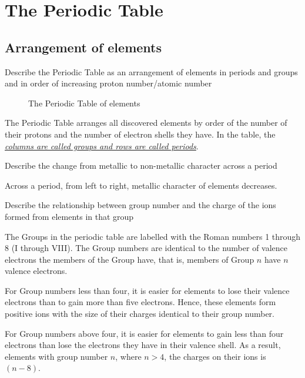 \section{The Periodic Table}
\subsection{Arrangement of elements}

\begin{point}
Describe the Periodic Table as an arrangement of elements in periods and groups and in order of increasing 
proton number/atomic number
\end{point}

\begin{figure}
	\caption{The Periodic Table of elements}
\end{figure}

The Periodic Table arranges all discovered elements by order of the number of their protons and
the number of electron shells they have. In the table, the \ul{\emph{columns are called groups
and rows are called periods}}.

\begin{point}
Describe the change from metallic to non-metallic character across a period
\end{point}

Across a period, from left to right, metallic character of elements decreases.

\begin{point}
Describe the relationship between group number and the charge of the ions formed from elements in that 
group
\end{point}

The Groups in the periodic table are labelled with the Roman numbers 1 through 8 (I through VIII).
The Group numbers are identical to the number of valence electrons the members of the Group
have, that is, members of Group $n$ have $n$ valence electrons.

\smallskip

For Group numbers less than four, it is easier for elements to lose their valence electrons
than to gain more than five electrons. Hence, these elements form positive ions with the size
of their charges identical to their group number.

For Group numbers above four, it is easier for elements to gain less than four electrons than
lose the electrons they have in their valence shell. As a result, elements with group number
$n$, where $n > 4$, the charges on their ions is $(n-8)$.

